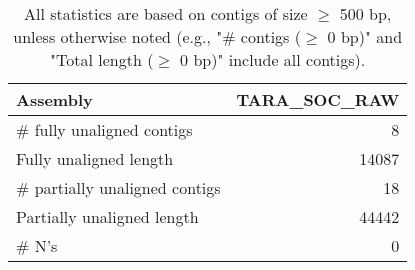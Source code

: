 \documentclass[12pt,a4paper]{article}
\begin{document}
\begin{table}[ht]
\begin{center}
\caption{All statistics are based on contigs of size $\geq$ 500 bp, unless otherwise noted (e.g., "\# contigs ($\geq$ 0 bp)" and "Total length ($\geq$ 0 bp)" include all contigs).}
\begin{tabular}{|l*{1}{|r}|}
\hline
Assembly & TARA\_SOC\_RAW \\ \hline
\# fully unaligned contigs & 8 \\ \hline
Fully unaligned length & 14087 \\ \hline
\# partially unaligned contigs & 18 \\ \hline
Partially unaligned length & 44442 \\ \hline
\# N's & 0 \\ \hline
\end{tabular}
\end{center}
\end{table}
\end{document}
